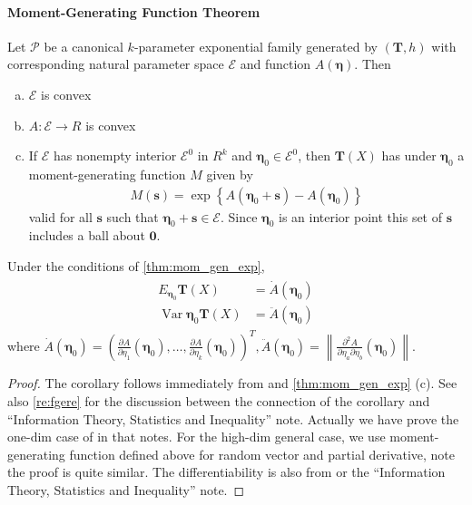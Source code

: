 \documentclass{article}
\begin{document}
\paragraph{Moment-Generating Function Theorem}
\begin{thma}\label{thm:mom_gen_exp}
Let $\mathcal{P}$ be a canonical $k$-parameter exponential family generated by $(\mathbf{T}, h)$ with corresponding natural parameter space $\mathcal{E}$ and function $A(\boldsymbol{\eta})$. Then
\begin{enumerate}[(a).]
    \item $\mathcal{E}$ is convex
    \item $A: \mathcal{E} \rightarrow R$ is convex
    \item If $\mathcal{E}$ has nonempty interior $\mathcal{E}^{0}$ in $R^{k}$ and $\boldsymbol{\eta}_{0} \in \mathcal{E}^{0}$, then $\mathbf{T}(X)$ has under $\boldsymbol{\eta}_{0}$ a moment-generating function $M$ given by
\begin{align*}
M(\mathbf{s})=\exp \left\{A\left(\boldsymbol{\eta}_{0}+\mathbf{s}\right)-A\left(\boldsymbol{\eta}_{0}\right)\right\}
\end{align*}
valid for all $\mathbf{s}$ such that $\boldsymbol{\eta}_{0}+\mathbf{s} \in \mathcal{E}$. Since $\boldsymbol{\eta}_{0}$ is an interior point this set of $\mathbf{s}$ includes a ball about $\mathbf{0}$.
\end{enumerate}
\end{thma}
\begin{cora}
Under the conditions of \cref{thm:mom_gen_exp},
\begin{align*}
\begin{aligned}
E_{\boldsymbol{\eta}_{0}} \mathbf{T}(X) &=\dot{A}\left(\boldsymbol{\eta}_{0}\right) \\
\operatorname{Var} \boldsymbol{\eta}_{0} \mathbf{T}(X) &=\ddot{A}\left(\boldsymbol{\eta}_{0}\right)
\end{aligned}
\end{align*}
where $\dot{A}\left(\boldsymbol{\eta}_{0}\right)=\left(\frac{\partial A}{\partial \eta_{1}}\left(\boldsymbol{\eta}_{0}\right), \ldots, \frac{\partial A}{\partial \eta_{k}}\left(\boldsymbol{\eta}_{0}\right)\right)^{T}, \ddot{A}\left(\boldsymbol{\eta}_{0}\right)=\left\|\frac{\partial^{2} A}{\partial \eta_{a} \partial \eta_{b}}\left(\boldsymbol{\eta}_{0}\right)\right\|$.
\end{cora}
\begin{proof} 
The corollary follows immediately from \cite[Theorem B.5.1]{Statistics} and \cref{thm:mom_gen_exp} (c). See also \cref{re:fgere} for the discussion between the connection of the corollary and ``Information Theory, Statistics and Inequality'' note. Actually we have prove the one-dim case of  \cite[Theorem B.5.1]{Statistics}  in that notes. For the high-dim general case, we use moment-generating function defined above for random vector and partial derivative, note the proof is quite similar.  The differentiability is also from  \cite[Theorem B.5.1]{Statistics} or the ``Information Theory, Statistics and Inequality'' note.
\end{proof}
\end{document}

